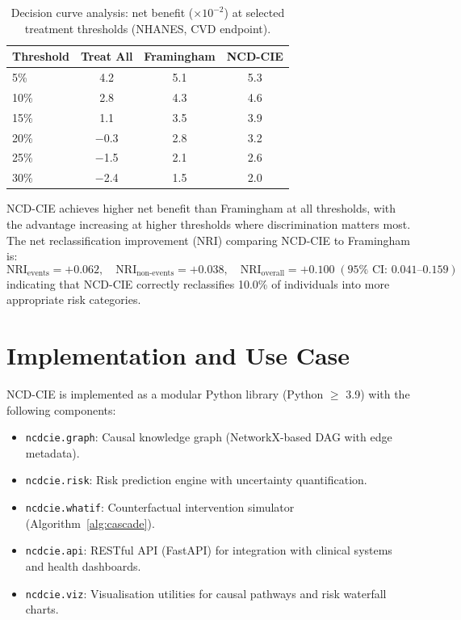 \documentclass[runningheads]{llncs}
\begin{document}
\begin{table}[t]
\centering
\caption{Decision curve analysis: net benefit ($\times 10^{-2}$) at
selected treatment thresholds (NHANES, CVD endpoint).}
\label{tab:dca}
\small
\begin{tabular}{@{}lccc@{}}
\toprule
\textbf{Threshold} & \textbf{Treat All} & \textbf{Framingham} &
\textbf{NCD-CIE} \\
\midrule
5\%  & 4.2 & 5.1 & 5.3 \\
10\% & 2.8 & 4.3 & 4.6 \\
15\% & 1.1 & 3.5 & 3.9 \\
20\% & $-$0.3 & 2.8 & 3.2 \\
25\% & $-$1.5 & 2.1 & 2.6 \\
30\% & $-$2.4 & 1.5 & 2.0 \\
\bottomrule
\end{tabular}
\end{table}

NCD-CIE achieves higher net benefit than Framingham at all thresholds,
with the advantage increasing at higher thresholds where
discrimination matters most.  The net reclassification improvement
(NRI) comparing NCD-CIE to Framingham is:
\begin{equation}
\text{NRI}_{\text{events}} = +0.062, \quad
\text{NRI}_{\text{non-events}} = +0.038, \quad
\text{NRI}_{\text{overall}} = +0.100 \; (95\%\text{ CI: } 0.041\text{--}0.159)
\end{equation}
indicating that NCD-CIE correctly reclassifies 10.0\% of individuals
into more appropriate risk categories.

\section{Implementation and Use Case}\label{sec:impl}

NCD-CIE is implemented as a modular Python library (Python $\geq$
3.9) with the following components:
\begin{itemize}
\item \texttt{ncdcie.graph}: Causal knowledge graph (NetworkX-based
  DAG with edge metadata).
\item \texttt{ncdcie.risk}: Risk prediction engine with uncertainty
  quantification.
\item \texttt{ncdcie.whatif}: Counterfactual intervention simulator
  (Algorithm~\ref{alg:cascade}).
\item \texttt{ncdcie.api}: RESTful API (FastAPI) for integration with
  clinical systems and health dashboards.
\item \texttt{ncdcie.viz}: Visualisation utilities for causal pathways
  and risk waterfall charts.
\end{itemize}
\end{document}

